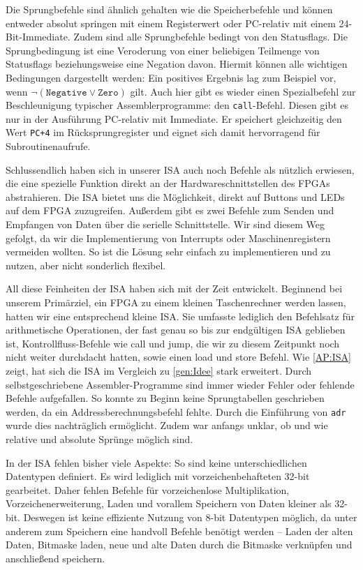 Die Sprungbefehle sind ähnlich gehalten wie die Speicherbefehle und
können entweder absolut springen mit einem Registerwert oder PC-relativ mit einem 24-Bit-Immediate.
Zudem sind alle Sprungbefehle bedingt von den Statusflags.
Die Sprungbedingung ist eine Veroderung von einer beliebigen Teilmenge von Statusflags beziehungsweise eine Negation davon.
Hiermit können alle wichtigen Bedingungen dargestellt werden:
Ein positives Ergebnis lag zum Beispiel vor, wenn $\neg (\texttt{Negative} \lor \texttt{Zero})$ gilt.
Auch hier gibt es wieder einen Spezialbefehl zur Beschleunigung typischer Assemblerprogramme: den \texttt{call}-Befehl.
Diesen gibt es nur in der Ausführung PC-relativ mit Immediate.
Er speichert gleichzeitig den Wert \texttt{PC+4} im Rücksprungregister und
eignet sich damit hervorragend für Subroutinenaufrufe.

Schlussendlich haben sich in unserer ISA auch noch Befehle als nützlich erwiesen,
die eine spezielle Funktion direkt an der Hardwareschnittstellen des FPGAs abstrahieren.
Die ISA bietet uns die Möglichkeit, direkt auf Buttons und LEDs auf dem FPGA zuzugreifen.
Außerdem gibt es zwei Befehle zum Senden und Empfangen von Daten über die serielle Schnittstelle.
Wir sind diesem Weg gefolgt, da wir die Implementierung von Interrupts oder Maschinenregistern vermeiden wollten.
So ist die Lösung sehr einfach zu implementieren und zu nutzen, aber nicht sonderlich flexibel.

All diese Feinheiten der ISA haben sich mit der Zeit entwickelt.
Beginnend bei unserem Primärziel, ein FPGA zu einem kleinen Taschenrechner werden lassen, hatten wir eine entsprechend kleine ISA.
Sie umfasste lediglich den Befehlsatz für arithmetische Operationen, der fast genau so bis zur endgültigen ISA geblieben ist,
Kontrollfluss-Befehle wie call und jump, die wir zu diesem Zeitpunkt noch nicht weiter durchdacht hatten, sowie einen load und store Befehl.
Wie \autoref{AP:ISA} zeigt, hat sich die ISA im Vergleich zu \autoref{gen:Idee} stark erweitert.
Durch selbstgeschriebene Assembler-Programme sind immer wieder Fehler oder fehlende Befehle aufgefallen.
So konnte zu Beginn keine Sprungtabellen geschrieben werden, da ein Addressberechnungsbefehl fehlte.
Durch die Einführung von \texttt{adr} wurde dies nachträglich ermöglicht.
Zudem war anfangs unklar, ob und wie relative und absolute Sprünge möglich sind.

In der ISA fehlen bisher viele Aspekte:
So sind keine unterschiedlichen Datentypen definiert. Es wird lediglich mit vorzeichenbehafteten 32-bit gearbeitet.
Daher fehlen Befehle für vorzeichenlose Multiplikation, Vorzeichenerweiterung, Laden und vorallem Speichern von Daten kleiner als 32-bit.
Deswegen ist keine effiziente Nutzung von 8-bit Datentypen möglich, da unter anderem zum Speichern eine handvoll Befehle benötigt werden -- Laden der alten Daten,
Bitmaske laden, neue und alte Daten durch die Bitmaske verknüpfen und anschließend speichern.

